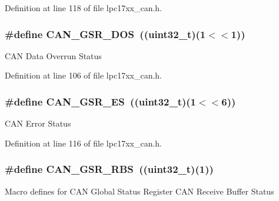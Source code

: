 \-Definition at line 118 of file lpc17xx\-\_\-can.\-h.

\hypertarget{group___c_a_n___private___macros_ga2812bef760e324f711bdf9f5ec6080db}{
\subsubsection[{\-C\-A\-N\-\_\-\-G\-S\-R\-\_\-\-D\-O\-S}]{\setlength{\rightskip}{0pt plus 5cm}\#define {\bf \-C\-A\-N\-\_\-\-G\-S\-R\-\_\-\-D\-O\-S}~((uint32\-\_\-t)(1$<$$<$1))}}\label{group___c_a_n___private___macros_ga2812bef760e324f711bdf9f5ec6080db}
\-C\-A\-N \-Data \-Overrun \-Status 

\-Definition at line 106 of file lpc17xx\-\_\-can.\-h.

\hypertarget{group___c_a_n___private___macros_ga2e57210b60bc08effc08aa5362978cdc}{
\subsubsection[{\-C\-A\-N\-\_\-\-G\-S\-R\-\_\-\-E\-S}]{\setlength{\rightskip}{0pt plus 5cm}\#define {\bf \-C\-A\-N\-\_\-\-G\-S\-R\-\_\-\-E\-S}~((uint32\-\_\-t)(1$<$$<$6))}}\label{group___c_a_n___private___macros_ga2e57210b60bc08effc08aa5362978cdc}
\-C\-A\-N \-Error \-Status 

\-Definition at line 116 of file lpc17xx\-\_\-can.\-h.

\hypertarget{group___c_a_n___private___macros_gacde523e4e3bdc91292d6fca05f3cf744}{
\subsubsection[{\-C\-A\-N\-\_\-\-G\-S\-R\-\_\-\-R\-B\-S}]{\setlength{\rightskip}{0pt plus 5cm}\#define {\bf \-C\-A\-N\-\_\-\-G\-S\-R\-\_\-\-R\-B\-S}~((uint32\-\_\-t)(1))}}\label{group___c_a_n___private___macros_gacde523e4e3bdc91292d6fca05f3cf744}
\-Macro defines for \-C\-A\-N \-Global \-Status \-Register \-C\-A\-N \-Receive \-Buffer \-Status 

